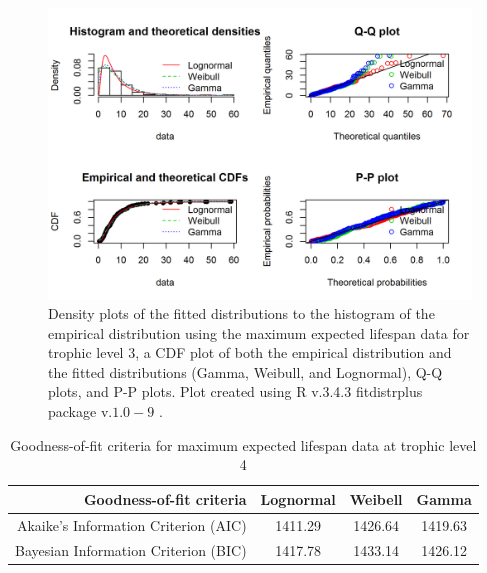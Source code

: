 \documentclass[oneside,12pt,final]{sty/ucthesis-CA2012}
\let\cite\citep                             %
\begin{document}
\begin{mainmatter}
\begin{figure}[H]
     \centering
       \includegraphics[width=.8\textwidth]{fig/gof_l3}
    \caption{Density plots of the fitted distributions to the histogram of the empirical distribution using the maximum expected lifespan data for trophic level 3, a CDF plot of both the empirical distribution and the fitted distributions (Gamma, Weibull, and Lognormal), Q-Q plots, and P-P plots. Plot created using R v.3.4.3 \cite{Rcite} fitdistrplus package v.$1.0-9$ \cite{fitdistrplus}. }
    \label{gof_l3}
\end{figure}

\begin{table}[H]
\centering
\caption{Goodness-of-fit criteria for maximum expected lifespan data at trophic level 4}
\begin{tabular}{r|c|c|c}
  \hline \small
 Goodness-of-fit criteria & Lognormal & Weibell & Gamma \\ 
   \hline
   Akaike's Information Criterion (AIC) & 1411.29 & 1426.64 & 1419.63 \\   
   Bayesian Information Criterion (BIC) & 1417.78 & 1433.14 & 1426.12 \\
   \hline
\end{tabular} 
\label{l4_aic}
\end{table}


\end{mainmatter}
\end{document}

